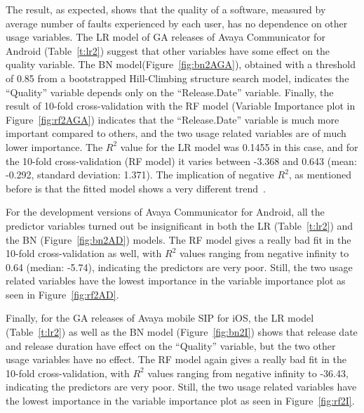 \documentclass[smallextended]{svjour3}       %
\begin{document}
The result, as expected, shows that the quality of a software, measured by average number of faults experienced by each user, has no dependence on other usage variables. 
The LR model of GA releases of Avaya Communicator for Android (Table~\ref{t:lr2}) suggest that other variables have some effect on the quality variable.
The BN model(Figure~\ref{fig:bn2AGA}), obtained with a threshold of 0.85 from a bootstrapped Hill-Climbing structure search model, indicates the ``Quality'' variable depends only on  the ``Release.Date'' variable.
Finally, the result of 10-fold cross-validation with the RF model (Variable Importance plot in Figure~\ref{fig:rf2AGA}) indicates that the ``Release.Date'' variable is much more important compared to others, and the two usage related variables are of much lower importance. The $R^2$ value for the LR model was 0.1455 in this case, and for the 10-fold cross-validation (RF model) it varies between -3.368 and 0.643 (mean: -0.292, standard deviation: 1.371). The implication of negative $R^2$, as mentioned before is that the fitted model shows a very different trend~\cite{negRsq}.

For the development versions of Avaya Communicator for Android, all the predictor variables turned out be insignificant in both the LR (Table~\ref{t:lr2}) and the BN (Figure~\ref{fig:bn2AD}) models. The RF model gives a really bad fit in the 10-fold cross-validation as well, with $R^2$ values ranging from negative infinity to 0.64 (median: -5.74), indicating the predictors are very poor. Still, the two usage related variables have the lowest importance in the variable importance plot as seen in Figure~\ref{fig:rf2AD}.

Finally, for the GA releases of Avaya mobile SIP for iOS, the LR model (Table~\ref{t:lr2}) as well as the BN model (Figure~\ref{fig:bn2I})  shows that release date and release duration have effect on the ``Quality'' variable, but the two other usage variables have no effect. The RF model again gives a really bad fit in the 10-fold cross-validation, with $R^2$ values ranging from negative infinity to -36.43, indicating the predictors are very poor. Still, the two usage related variables have the lowest importance in the variable importance plot as seen in Figure~\ref{fig:rf2I}.
\end{document}
